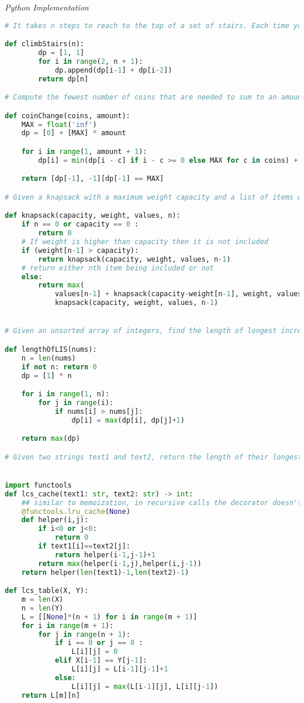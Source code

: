 \documentclass{article}
\begin{document}
\vspace{8pt} \emph{Python Implementation}
\begin{lstlisting}[language=Python]
# It takes n steps to reach to the top of a set of stairs. Each time you can either climb 1 or 2 steps. In how many distinct ways can you climb to the top?

def climbStairs(n):
        dp = [1, 1]
        for i in range(2, n + 1):
            dp.append(dp[i-1] + dp[i-2])
        return dp[n]

# Compute the fewest number of coins that are needed to sum to an amount

def coinChange(coins, amount):
    MAX = float('inf')
    dp = [0] + [MAX] * amount

    for i in range(1, amount + 1):
        dp[i] = min(dp[i - c] if i - c >= 0 else MAX for c in coins) + 1

    return [dp[-1], -1][dp[-1] == MAX]

# Given a knapsack with a maximum weight capacity and a list of items with value and weights, maximize the amount of value we can fit within the knapsacks weight capacity.

def knapsack(capacity, weight, values, n):
    if n == 0 or capacity == 0 :
        return 0
    # If weight is higher than capacity then it is not included
    if (weight[n-1] > capacity):
        return knapsack(capacity, weight, values, n-1)
    # return either nth item being included or not
    else:
        return max(
            values[n-1] + knapsack(capacity-weight[n-1], weight, values, n-1),
            knapsack(capacity, weight, values, n-1)


# Given an unsorted array of integers, find the length of longest increasing subsequence.

def lengthOfLIS(nums):
    n = len(nums)
    if not n: return 0
    dp = [1] * n

    for i in range(1, n):
        for j in range(i):
            if nums[i] > nums[j]:
                dp[i] = max(dp[i], dp[j]+1)

    return max(dp)

# Given two strings text1 and text2, return the length of their longest common subsequence.


import functools
def lcs_cache(text1: str, text2: str) -> int:
    ## similar to memoization, in recursive calls the decorator doesn't have to recompute but retrieves from the cache
    @functools.lru_cache(None)
    def helper(i,j):
        if i<0 or j<0:
            return 0
        if text1[i]==text2[j]:
            return helper(i-1,j-1)+1
        return max(helper(i-1,j),helper(i,j-1))
    return helper(len(text1)-1,len(text2)-1)

def lcs_table(X, Y): 
    m = len(X) 
    n = len(Y) 
    L = [[None]*(n + 1) for i in range(m + 1)] 
    for i in range(m + 1): 
        for j in range(n + 1): 
            if i == 0 or j == 0 : 
                L[i][j] = 0
            elif X[i-1] == Y[j-1]: 
                L[i][j] = L[i-1][j-1]+1
            else:
                L[i][j] = max(L[i-1][j], L[i][j-1]) 
    return L[m][n] 
\end{lstlisting}
\end{document}
